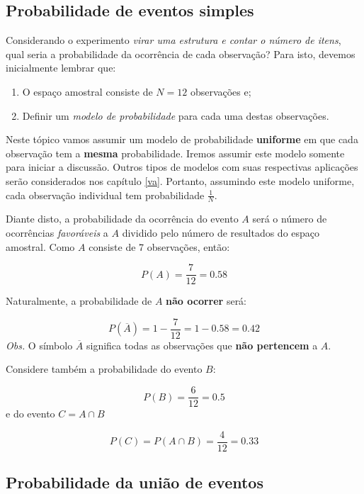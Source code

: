 \documentclass[
]{book}
\begin{document}
\hypertarget{probabilidade-de-eventos-simples}{%
\subsection{Probabilidade de eventos simples}\label{probabilidade-de-eventos-simples}}

Considerando o experimento \emph{virar uma estrutura e contar o número de itens}, qual seria a probabilidade da ocorrência de cada observação? Para isto, devemos inicialmente lembrar que:

\begin{enumerate}
\def\labelenumi{\arabic{enumi}.}
\item
  O espaço amostral consiste de \(N = 12\) observações e;
\item
  Definir um \emph{modelo de probabilidade} para cada uma destas observações.
\end{enumerate}

Neste tópico vamos assumir um modelo de probabilidade \textbf{uniforme} em que cada observação tem a \textbf{mesma} probabilidade. Iremos assumir este modelo somente para iniciar a discussão. Outros tipos de modelos com suas respectivas aplicações serão considerados nos capítulo \ref{va}. Portanto, assumindo este modelo uniforme, cada observação individual tem probabilidade \(\frac{1}{N}\).

Diante disto, a probabilidade da ocorrência do evento \(A\) será o número de ocorrências \emph{favoráveis} a \(A\) dividido pelo número de resultados do espaço amostral. Como \(A\) consiste de 7 observações, então:

\[P(A) = \frac{7}{12} = 0.58\]

Naturalmente, a probabilidade de \(A\) \textbf{não ocorrer} será:

\[P(\overline{A}) = 1 - \frac{7}{12} = 1 - 0.58 = 0.42\]
\emph{Obs.} O símbolo \(\overline{A}\) significa todas as observações que \textbf{não pertencem} a \(A\).

Considere também a probabilidade do evento \(B\):

\[P(B) = \frac{6}{12} = 0.5\]
e do evento \(C = A \cap B\)

\[P(C) = P(A \cap B) = \frac{4}{12} = 0.33\]

\hypertarget{probabilidade-da-uniuxe3o-de-eventos}{%
\subsection{Probabilidade da união de eventos}\label{probabilidade-da-uniuxe3o-de-eventos}}
\end{document}

